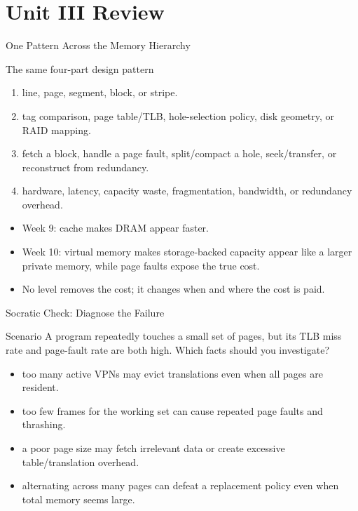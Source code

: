 \documentclass[aspectratio=169]{beamer}
\begin{document}

\section{Unit III Review}

\begin{frame}{One Pattern Across the Memory Hierarchy}
  \begin{block}{The same four-part design pattern}
    \begin{enumerate}
      \item {} line, page, segment, block, or stripe.
      \item {} tag comparison, page table/TLB,
        hole-selection policy, disk geometry, or RAID mapping.
      \item {} fetch a block, handle a page fault,
        split/compact a hole, seek/transfer, or reconstruct from redundancy.
      \item {} hardware, latency, capacity waste, fragmentation,
        bandwidth, or redundancy overhead.
    \end{enumerate}
  \end{block}
  \begin{itemize}
    \item Week 9: cache makes DRAM appear faster.
    \item Week 10: virtual memory makes storage-backed capacity appear like a
      larger private memory, while page faults expose the true cost.
    \item No level removes the cost; it changes when and where the cost is paid.
  \end{itemize}
\end{frame}

\begin{frame}{Socratic Check: Diagnose the Failure}
  \begin{alertblock}{Scenario}
    A program repeatedly touches a small set of pages, but its TLB miss rate
    and page-fault rate are both high. Which facts should you investigate?
  \end{alertblock}
  \begin{itemize}
    \item {} too many active VPNs may evict
      translations even when all pages are resident.
    \item {} too few frames for the working set can cause
      repeated page faults and thrashing.
    \item {} a poor page size may fetch irrelevant data
      or create excessive table/translation overhead.
    \item {} alternating across many pages can defeat a
      replacement policy even when total memory seems large.
  \end{itemize}
\end{frame}
\end{document}
